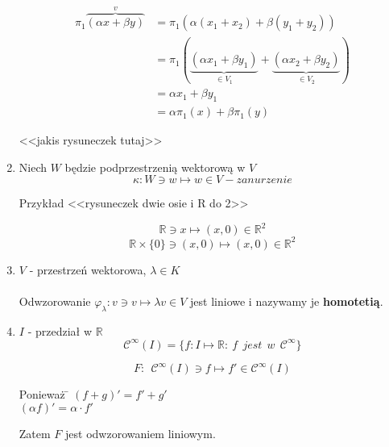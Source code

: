 \documentclass[a5paper,8pt]{article}
\begin{document}
\begin{enumerate}[label=\textbf{\arabic*})]
            \begin{equation*}
                \begin{aligned}
                    \pi_1 \overbrace{(\alpha x + \beta y)}^{v} &= \pi_1 ( \alpha(x_1 + x_2) + \beta(y_1 + y_2))\\
                    & = \pi_1( \underbrace{( \alpha x_1 + \beta y_1 )}_{\in V_1}
                        + \underbrace{( \alpha x_2 + \beta y_2 )}_{\in V_2})\\
                    & = \alpha x_1 + \beta y_1 \\
                    & = \alpha \pi_1(x) + \beta \pi_1(y)
                \end{aligned}
            \end{equation*}

            <<jakis rysuneczek tutaj>>
        \item
            Niech $W$ będzie podprzestrzenią wektorową w $V$\\
            \begin{equation*}
                \kappa: W \ni w \longmapsto w \in V - zanurzenie
            \end{equation*}

            Przykład <<rysuneczek dwie osie i R do 2>>

            \begin{equation*}
                \mathbb{R} \ni x \longmapsto (x,0) \in \mathbb{R}^2
            \end{equation*}
            \begin{equation*}
                \mathbb{R} \times \{0\} \ni (x,0) \longmapsto (x,0) \in \mathbb{R}^2
            \end{equation*}
        \item
            $ V $ - przestrzeń wektorowa, $ \lambda \in K $\\\\
            Odwzorowanie $ \varphi_\lambda: v \ni v \longmapsto \lambda v \in V $
            jest liniowe i nazywamy je \textbf{homotetią}.
        \item
            $ I $ - przedział w $ \mathbb{R} $ \\
            \begin{equation*}
                \mathcal{C}^\infty(I) = \{ f: I \longmapsto \mathbb{R}:
                ~f~~jest~~w~~\mathcal{C}^\infty \}
            \end{equation*}

            \begin{equation*}
                F:~~ \mathcal{C}^\infty(I) \ni f \longmapsto f' \in \mathcal{C}^\infty(I)
            \end{equation*}

            \begin{tabbing}
                Ponieważ \= $ (f+g)' = f' + g' $ \\
                         \> $ (\alpha f)' = \alpha \cdot f' $
            \end{tabbing}

            Zatem $F$ jest odwzorowaniem liniowym.
    \end{enumerate}
\end{document}
